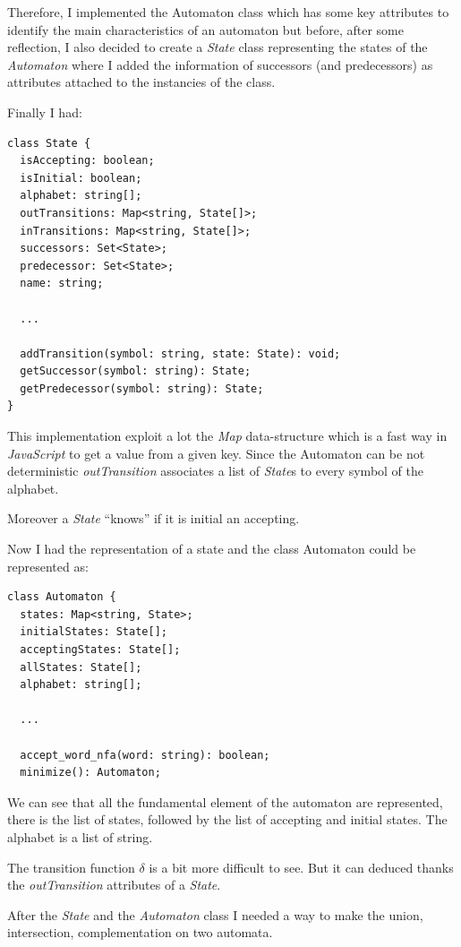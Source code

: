 Therefore, I implemented the Automaton class which has some key attributes to identify the main characteristics of an automaton but before, after some reflection, I also decided to create a \textit{State} class representing the states of the \textit{Automaton} where I added the information of successors (and predecessors) as attributes attached to the instancies of the class.

Finally I had:


\begin{lstlisting}[caption=State class]
class State {
  isAccepting: boolean;
  isInitial: boolean;
  alphabet: string[];
  outTransitions: Map<string, State[]>;
  inTransitions: Map<string, State[]>;
  successors: Set<State>;
  predecessor: Set<State>;
  name: string;

  ... 

  addTransition(symbol: string, state: State): void;
  getSuccessor(symbol: string): State;
  getPredecessor(symbol: string): State;
}
\end{lstlisting}

This implementation exploit a lot the \textit{Map} data-structure which is a fast way in \textit{JavaScript} to get a value from a given key. Since the Automaton can be not deterministic \textit{outTransition} associates a list of \textit{State}s to every symbol of the alphabet.

Moreover a \textit{State} ``knows'' if it is initial an accepting.

Now I had the representation of a state and the class Automaton could be represented as:

\begin{lstlisting}[caption = Automaton class]
class Automaton {
  states: Map<string, State>;
  initialStates: State[];
  acceptingStates: State[];
  allStates: State[];
  alphabet: string[];

  ... 

  accept_word_nfa(word: string): boolean;
  minimize(): Automaton;
\end{lstlisting}

We can see that all the fundamental element of the automaton are represented, there is the list of states, followed by the list of accepting and initial states. The alphabet is a list of string.

The transition function $\delta$ is a bit more difficult to see. But it can deduced thanks the \textit{outTransition} attributes of a \textit{State}.

After the \textit{State} and the \textit{Automaton} class I needed a way to make the union, intersection, complementation on two automata.

